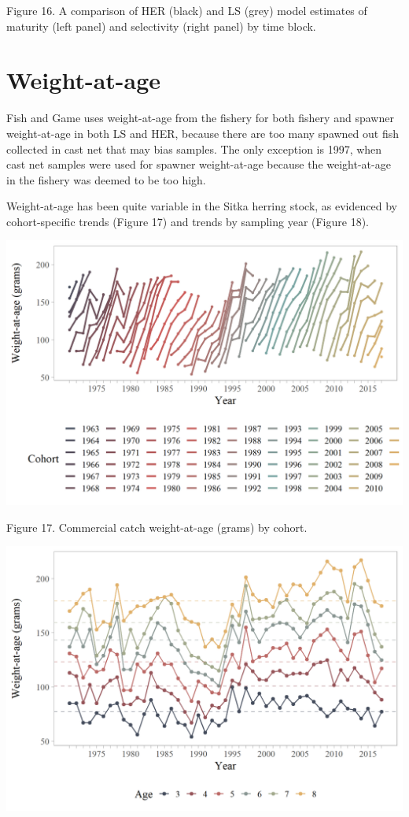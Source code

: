 \documentclass[]{article}
\begin{document}
Figure 16. A comparison of HER (black) and LS (grey) model estimates of
maturity (left panel) and selectivity (right panel) by time block.

\section{Weight-at-age}\label{weight-at-age}

Fish and Game uses weight-at-age from the fishery for both fishery and
spawner weight-at-age in both LS and HER, because there are too many
spawned out fish collected in cast net that may bias samples. The only
exception is 1997, when cast net samples were used for spawner
weight-at-age because the weight-at-age in the fishery was deemed to be
too high.

Weight-at-age has been quite variable in the Sitka herring stock, as
evidenced by cohort-specific trends (Figure 17) and trends by sampling
year (Figure 18).

\includegraphics[width=1\linewidth]{../../HER/figs/waa_cohort_plot}

Figure 17. Commercial catch weight-at-age (grams) by cohort.

\includegraphics[width=1\linewidth]{../../HER/figs/waa_plot}
\end{document}
